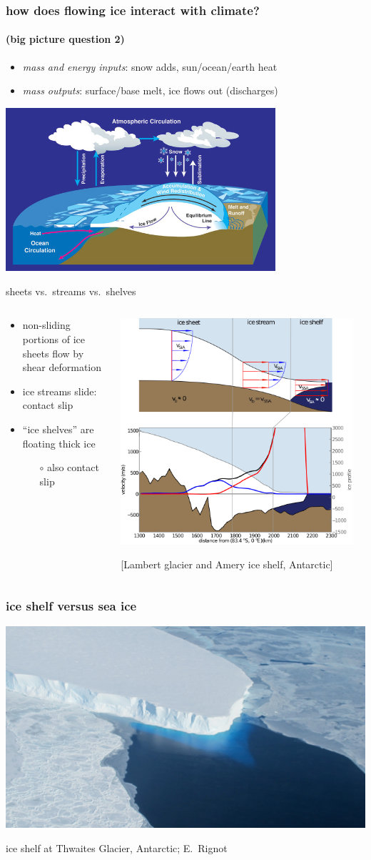 \documentclass[10pt,hyperref={pdfpagelabels=true}]{beamer}
\newcommand{\contactslipslide}[1]{
\begin{frame}{#1 sheets vs.~streams vs.~shelves}

\begin{columns}
\begin{column}{0.35\textwidth}
\small
\begin{itemize}
\small
\item non-sliding portions of ice sheets flow by shear deformation
\item ice streams slide: \alert{contact slip}
\item ``ice shelves'' are floating thick ice
  \begin{itemize}
  \scriptsize
  \item[$\circ$] also \alert{contact slip}
  \end{itemize}
\end{itemize}
\end{column}

\begin{column}{0.65\textwidth}

\hfill\includegraphics[width=0.95\textwidth]{siassacartoon-lambert}

\begin{center}
\vspace{-0.18in}
\tiny [Lambert glacier and Amery ice shelf, Antarctic]
\end{center}
\end{column}
\end{columns}
\end{frame}
}
\begin{document}
\begin{frame}
  \frametitle{how does flowing ice interact with climate?}
  \framesubtitle{(big picture question 2)}

\medskip
\small
\begin{itemize}
\item \emph{mass and energy inputs}: snow adds, sun/ocean/earth heat
\item \emph{mass outputs}: surface/base melt, ice flows out (discharges)
\end{itemize}

\begin{center}
  \includegraphics[width=0.75\textwidth]{mass-bal-atmos}
\end{center}
\end{frame}


\contactslipslide{}


\begin{frame}
  \frametitle{ice shelf versus sea ice}

\begin{center}

\includegraphics[width=1.0\textwidth]{supp4rignot-small}

\medskip
\tiny ice shelf at Thwaites Glacier, Antarctic; E.~Rignot
\end{center}
\end{frame}
\end{document}
